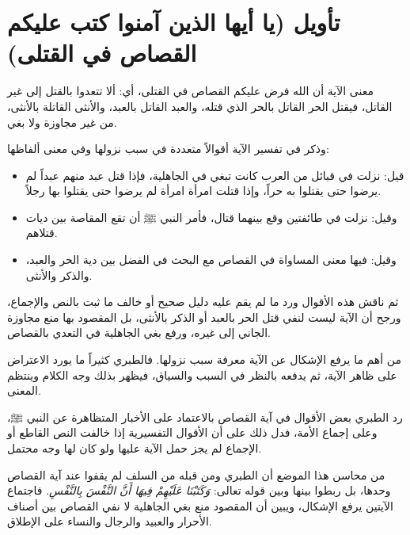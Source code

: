 \separator

\section{تأويل (يا أيها الذين آمنوا كتب عليكم القصاص في القتلى)}
 معنى الآية أن الله فرض عليكم القصاص في القتلى، أي: ألا تتعدوا بالقتل إلى غير القاتل، فيقتل الحر القاتل بالحر الذي قتله، والعبد القاتل بالعبد، والأنثى القاتلة بالأنثى، من غير مجاوزة ولا بغي.

وذكر  في تفسير الآية أقوالاً متعددة في سبب نزولها وفي معنى ألفاظها:
\begin{itemize}
    \item قيل: نزلت في قبائل من العرب كانت تبغي في الجاهلية، فإذا قتل عبد منهم عبداً لم يرضوا حتى يقتلوا به حراً، وإذا قتلت امرأة امرأة لم يرضوا حتى يقتلوا بها رجلاً.
    \item وقيل: نزلت في طائفتين وقع بينهما قتال، فأمر النبي ﷺ أن تقع المقاصة بين ديات قتلاهم.
    \item وقيل: فيها معنى المساواة في القصاص مع البحث في الفضل بين دية الحر والعبد، والذكر والأنثى.
\end{itemize}

ثم ناقش  هذه الأقوال ورد ما لم يقم عليه دليل صحيح أو خالف ما ثبت بالنص والإجماع، ورجح أن الآية ليست لنفي قتل الحر بالعبد أو الذكر بالأنثى، بل المقصود بها منع مجاوزة الجاني إلى غيره، ورفع بغي الجاهلية في التعدي بالقصاص.

\begin{fawaid}
من أهم ما يرفع الإشكال عن الآية معرفة سبب نزولها. فالطبري كثيراً ما يورد الاعتراض على ظاهر الآية، ثم يدفعه بالنظر في السبب والسياق، فيظهر بذلك وجه الكلام وينتظم المعنى.
\end{fawaid}

\begin{fawaid}
رد الطبري بعض الأقوال في آية القصاص بالاعتماد على الأخبار المتظاهرة عن النبي ﷺ، وعلى إجماع الأمة، فدل ذلك على أن الأقوال التفسيرية إذا خالفت النص القاطع أو الإجماع لم يجز حمل الآية عليها ولو كان لها وجه محتمل.
\end{fawaid}

\begin{fawaid}
من محاسن هذا الموضع أن الطبري ومن قبله من السلف لم يقفوا عند آية القصاص وحدها، بل ربطوا بينها وبين قوله تعالى: \textit{وَكَتَبْنَا عَلَيْهِمْ فِيهَا أَنَّ النَّفْسَ بِالنَّفْسِ}. فاجتماع الآيتين يرفع الإشكال، ويبين أن المقصود منع بغي الجاهلية لا نفي القصاص بين أصناف الأحرار والعبيد والرجال والنساء على الإطلاق.
\end{fawaid}


